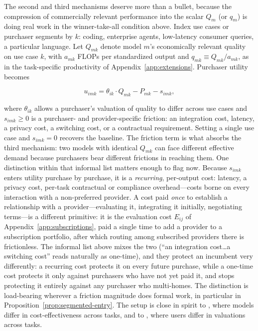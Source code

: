 \documentclass[11pt]{article}
\begin{document}
The second and third mechanisms deserve more than a bullet, because the compression of commercially relevant performance into the scalar $Q_m$ (or $q_m$) is doing real work in the winner-take-all condition above. Index use cases or purchaser segments by $k$: coding, enterprise agents, low-latency consumer queries, a particular language. Let $Q_{mk}$ denote model $m$'s economically relevant quality on use case $k$, with $a_{mk}$ FLOPs per standardized output and $q_{mk}\equiv Q_{mk}/a_{mk}$, as in the task-specific productivity of Appendix~\ref{app:extensions}. Purchaser utility becomes

\begin{equation}u_{imk}=\theta_{ik}\cdot Q_{mk}-P_{mk}-s_{imk},\end{equation}

where $\theta_{ik}$ allows a purchaser's valuation of quality to differ across use cases and $s_{imk}\geq0$ is a purchaser- and provider-specific friction: an integration cost, latency, a privacy cost, a switching cost, or a contractual requirement. Setting a single use case and $s_{imk}=0$ recovers the baseline. The friction term is what absorbs the third mechanism: two models with identical $Q_{mk}$ can face different effective demand because purchasers bear different frictions in reaching them. One distinction within that informal list matters enough to flag now. Because $s_{imk}$ enters utility purchase by purchase, it is a \emph{recurring}, per-output cost: latency, a privacy cost, per-task contractual or compliance overhead---costs borne on every interaction with a non-preferred provider. A cost paid \emph{once} to establish a relationship with a provider---evaluating it, integrating it initially, negotiating terms---is a different primitive: it is the evaluation cost $E_{ij}$ of Appendix~\ref{app:subscriptions}, paid a single time to add a provider to a subscription portfolio, after which routing among subscribed providers there is frictionless. The informal list above mixes the two (``an integration cost\ldots a switching cost'' reads naturally as one-time), and they protect an incumbent very differently: a recurring cost protects it on every future purchase, while a one-time cost protects it only against purchasers who have not yet paid it, and stops protecting it entirely against any purchaser who multi-homes. The distinction is load-bearing wherever a friction magnitude does formal work, in particular in Proposition~\ref{prop:segmented-entry}. The setup is close in spirit to \citet{mahmood2024}, where models differ in cost-effectiveness across tasks, and to \citet{bergemannBonattiSmolin2026}, where users differ in valuations across tasks.
\end{document}
